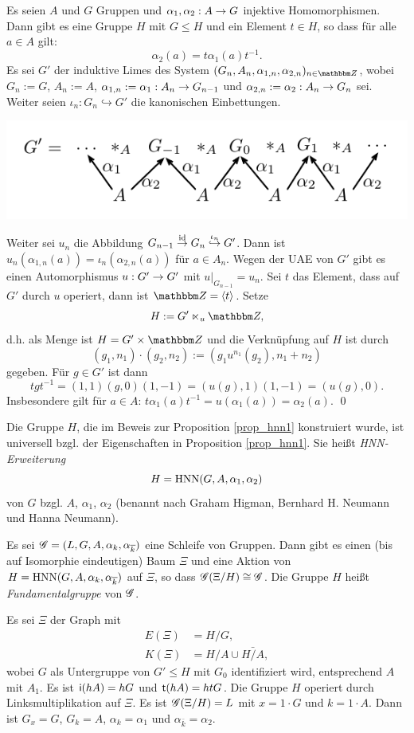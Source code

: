\documentclass[a4paper, 12pt, twoside]{article}
\begin{document}
\PROP\label{prop_hnn1}
Es seien $A$ und $G$ Gruppen und $\alpha_1,\alpha_2:A\rightarrow G$
injektive Homomorphismen.
Dann gibt es eine Gruppe $H$ mit $G\leq H$ und ein Element $t\in H$,
so dass für alle $a\in A$ gilt:
\[
\alpha_2(a) = t \alpha_1(a) t^{-1}.
\]
\bew Es sei $G'$ der induktive Limes des System
$(G_n, A_n, \alpha_{1,n}, \alpha_{2,n})_{n\in \ZZ}$,
wobei $G_n:=G$, $A_n:=A$, $\alpha_{1,n}:=\alpha_1:A_n\rightarrow G_{n-1}$
und $\alpha_{2,n}:=\alpha_2:A_n\rightarrow G_n$ sei.
Weiter seien $\iota_n:G_n \hookrightarrow G'$ die kanonischen Einbettungen.
\begin{center}
	\includegraphics{grugraImages/Glimes}
\end{center}
Weiter sei $u_n$ die Abbildung
$G_{n-1}\overset{\mathrm{id}}{\rightarrow} G_n \overset{\iota_n}{\hookrightarrow} G'$. Dann ist
$u_n(\alpha_{1,n}(a))=\iota_n(\alpha_{2,n}(a))$ für $a\in A_n$.
Wegen der UAE von $G'$ gibt es einen Automorphismus
$u:G'\rightarrow G'$ mit $u|_{G_{n-1}}=u_n$.
Sei $t$ das Element, dass auf $G'$ durch $u$ operiert, dann ist $\ZZ=\lag t \rag$.
Setze
\[
H := G' \ltimes_u \ZZ,
\]
d.h. als Menge ist $H=G'\times \ZZ$ und die Verknüpfung auf $H$
ist durch
\[
(g_1, n_1) \cdot (g_2, n_2) := (g_1 u^{n_1}(g_2), n_1+n_2)
\]
gegeben.
Für $g\in G'$ ist dann
\[
t g t^{-1} = (1,1)(g,0)(1,-1)
= (u(g),1)(1,-1) = (u(g),0).
\]
Insbesondere gilt für $a\in A$:
$t \alpha_1(a) t^{-1} = u(\alpha_1(a)) = \alpha_2(a)$.
\qed

\DB Die Gruppe $H$, die im Beweis zur Proposition \ref{prop_hnn1}
konstruiert wurde, ist universell bzgl. der Eigenschaften
in Proposition \ref{prop_hnn1}.
Sie heißt \emph{HNN-Erweiterung}
\[
H = \mathrm{HNN}(G,A,\alpha_1,\alpha_2)
\]
von $G$ bzgl. $A$, $\alpha_1$, $\alpha_2$
(benannt nach Graham Higman, Bernhard H. Neumann und Hanna Neumann).

\PROP \label{prop_hnn2}
Es sei $\mathscr{G}=(L,G,A,\alpha_k,\alpha_{\overline{k}})$ eine Schleife von
Gruppen. Dann gibt es einen (bis auf Isomorphie eindeutigen)
Baum $\Xi$ und eine Aktion von $H=\mathrm{HNN}(G,A,\alpha_k,\alpha_{\overline{k}})$
auf $\Xi$, so dass $\mathscr{G}(\Xi/H)\cong \mathscr{G}$.
Die Gruppe $H$ heißt \emph{Fundamentalgruppe}
von $\mathscr{G}$.

\bew Es sei $\Xi$ der Graph mit
\begin{align*}
E(\Xi) &= H/G, \\
K(\Xi) &= H/A \cup \bar{H/A},
\end{align*}
wobei $G$ als Untergruppe von $G'\leq H$ mit $G_0$ identifiziert wird,
entsprechend $A$ mit $A_1$.
Es ist $\mathsf{i}(hA)=hG$ und $\mathsf{t}(hA)=htG$.
Die Gruppe $H$ operiert durch Linksmultiplikation auf $\Xi$.
Es ist $\mathscr{G}(\Xi/H)=L$ mit $x=1\cdot G$ und $k=1\cdot A$.
Dann ist $G_x=G$, $G_k=A$, $\alpha_k=\alpha_1$ und
$\alpha_{\bar{k}}=\alpha_2$.
\end{document}
